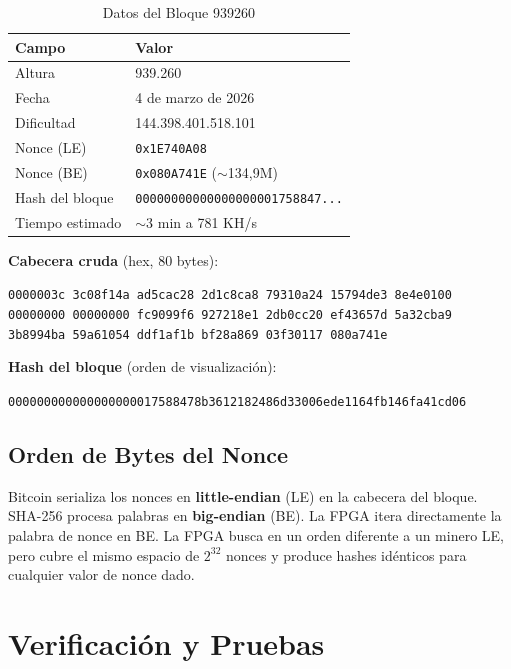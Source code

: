 \documentclass[12pt,a4paper]{article}
\begin{document}
\begin{table}[h]
    \centering
    \caption{Datos del Bloque 939260}
    \begin{tabular}{@{}ll@{}}
        \toprule
        \textbf{Campo} & \textbf{Valor} \\
        \midrule
        Altura                & 939.260 \\
        Fecha                 & 4 de marzo de 2026 \\
        Dificultad            & 144.398.401.518.101 \\
        Nonce (LE)            & \texttt{0x1E740A08} \\
        Nonce (BE)            & \texttt{0x080A741E} ($\sim$134,9M) \\
        Hash del bloque       & \texttt{00000000000000000001758847...} \\
        Tiempo estimado       & $\sim$3 min a 781 KH/s \\
        \bottomrule
    \end{tabular}
\end{table}

\textbf{Cabecera cruda} (hex, 80 bytes):

\texttt{\small 0000003c 3c08f14a ad5cac28 2d1c8ca8 79310a24 15794de3 8e4e0100}
\texttt{\small 00000000 00000000 fc9099f6 927218e1 2db0cc20 ef43657d 5a32cba9}
\texttt{\small 3b8994ba 59a61054 ddf1af1b bf28a869 03f30117 080a741e}

\textbf{Hash del bloque} (orden de visualizaci\'on):

\texttt{\small 000000000000000000017588478b3612182486d33006ede1164fb146fa41cd06}

\subsection{Orden de Bytes del Nonce}

Bitcoin serializa los nonces en \textbf{little-endian} (LE) en la cabecera del bloque.
SHA-256 procesa palabras en \textbf{big-endian} (BE). La FPGA itera directamente la
palabra de nonce en BE. La FPGA busca en un orden diferente a un minero LE, pero
cubre el mismo espacio de $2^{32}$ nonces y produce hashes id\'enticos para cualquier
valor de nonce dado.

\section{Verificaci\'on y Pruebas}
\end{document}
